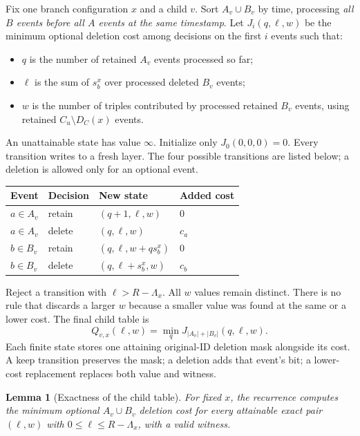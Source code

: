 \documentclass[11pt]{article}
\newtheorem{lemma}[theorem]{Lemma}
\theoremstyle{remark}
\newcommand{\infv}{\infty}
\begin{document}
Fix one branch configuration $x$ and a child $v$. Sort $A_v\cup B_v$ by time,
processing \emph{all $B$ events before all $A$ events at the same timestamp}.
Let $J_i(q,\ell,w)$ be the minimum optional deletion cost among decisions on
the first $i$ events such that:
\begin{itemize}
\item $q$ is the number of retained $A_v$ events processed so far;
\item $\ell$ is the sum of $s_b^x$ over processed deleted $B_v$ events;
\item $w$ is the number of triples contributed by processed retained $B_v$
events, using retained $C_u\setminus D_C(x)$ events.
\end{itemize}
An unattainable state has value $\infv$. Initialize only $J_0(0,0,0)=0$.
Every transition writes to a fresh layer. The four possible transitions are
listed below; a deletion is allowed only for an optional event.

\begin{center}
\begin{tabular}{llll}
\toprule
Event & Decision & New state & Added cost\\
\midrule
$a\in A_v$ & retain & $(q+1,\ell,w)$ & $0$\\
$a\in A_v$ & delete & $(q,\ell,w)$ & $c_a$\\
$b\in B_v$ & retain & $(q,\ell,w+q s_b^x)$ & $0$\\
$b\in B_v$ & delete & $(q,\ell+s_b^x,w)$ & $c_b$\\
\bottomrule
\end{tabular}
\end{center}

Reject a transition with $\ell>R-\Lambda_x$. All $w$ values remain distinct.
There is no rule that discards a larger $w$ because a smaller value was found
at the same or a lower cost. The final child table is
\[
 Q_{v,x}(\ell,w)=\min_q J_{|A_v|+|B_v|}(q,\ell,w).
\]
Each finite state stores one attaining original-ID deletion mask alongside
its cost. A keep transition preserves the mask; a deletion adds that event's
bit; a lower-cost replacement replaces both value and witness.

\begin{lemma}[Exactness of the child table]\label{lem:dp}
For fixed $x$, the recurrence computes the minimum optional $A_v\cup B_v$
deletion cost for every attainable exact pair $(\ell,w)$ with
$0\le\ell\le R-\Lambda_x$, with a valid witness.
\end{lemma}
\end{document}
